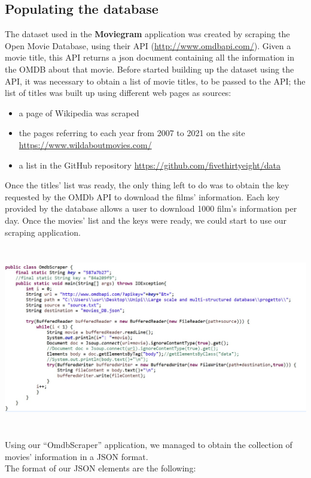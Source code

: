 \documentclass[a4paper, oneside]{article}
\begin{document}
\subsection{Populating the database}
The dataset used in the \textbf{Moviegram} application was created by scraping the Open Movie Database, using their API (\url{http://www.omdbapi.com/}). Given a movie title, this API returns a json document containing all the information in the OMDB about that movie. Before started building up the dataset using the API, it was necessary to obtain a list of movie titles, to be passed to the API; the list of titles was built up using different web pages as sources:
\begin{itemize}
\item a page of Wikipedia was scraped
\item the pages referring to each year from 2007 to 2021 on the site \url{https://www.wildaboutmovies.com/}
\item a list in the GitHub repository \url{https://github.com/fivethirtyeight/data}
\end{itemize}
Once the titles’ list was ready, the only thing left to do was to obtain the key requested by the OMDb API to download the films’ information. Each key provided by the database allows a user to download 1000 film’s information per day. Once the movies’ list and the keys were ready, we could start to use our scraping application.\\

\begin{minipage}{\linewidth}
\begin{center}
\vspace{1mm}
\includegraphics[height = 80mm]{./images/screens/OMDBScraperScreen.jpg} 
\vspace{6mm}
\label{fig:OMDBScraper}
\vspace{4mm}
\end{center}
\end{minipage}
Using our “OmdbScraper” application, we managed to obtain the collection of movies’ information in a JSON format.\\ The format of our JSON elements are the following:\\
\end{document}

